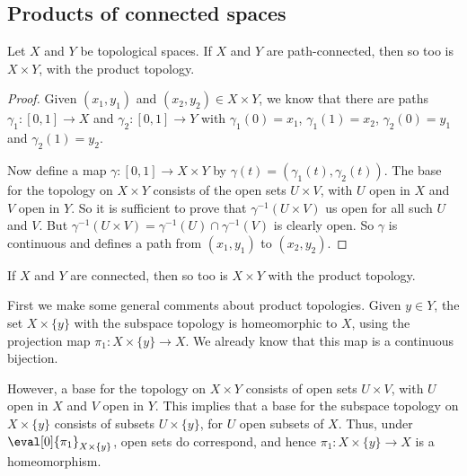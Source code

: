 
	\pagebreak

\subsection{Products of connected spaces} %
\label{sub:products_of_connected_spaces}

\begin{proposition}
	\label{prop:3-path-connected-product-topology}
	Let $X$ and $Y$ be topological spaces. If $X$ and $Y$ are path-connected, then so too is $X\times Y$, with the product topology.
\end{proposition}

\begin{proof}
	Given $(x_1,y_1)$ and $(x_2,y_2)\in X\times Y$, we know that there are paths $\gamma_1:[0,1]\to X$ and $\gamma_2:[0,1]\to Y$ with $\gamma_1(0)=x_1$, $\gamma_1(1)=x_2$, $\gamma_2(0)=y_1$ and $\gamma_2(1)=y_2$.
	
	Now define a map $\gamma:[0,1]\to X\times Y$ by $\gamma(t) = (\gamma_1(t),\gamma_2(t))$. %
	The base for the topology on $X\times Y$ consists of the open sets $U\times V$, with $U$ open in $X$ and $V$ open in $Y$. So it is sufficient to prove that $\gamma^{-1}(U\times V)$ us open for all such $U$ and $V$. But $\gamma^{-1}(U\times V)=\gamma^{-1}(U) \cap \gamma^{-1}(V)$ is clearly open. So $\gamma$ is continuous and defines a path from $(x_1,y_1)$ to $(x_2,y_2)$.
\end{proof}

\begin{proposition}
	If $X$ and $Y$ are connected, then so too is $X \times Y$ with the product topology. \label{prop:connected-products}
\end{proposition}

\vspace{-8pt}

First we make some general comments about product topologies. Given $y\in Y$, the set $X\times\{y\}$ with the subspace topology is homeomorphic to $X$, using the projection map $\pi_1:X \times \{y\} \to X$. We already know that this map is a continuous bijection.

However, a base for the topology on $X \times Y$ consists of open sets $U\times V$, with $U$ open in $X$ and $V$ open in $Y$. This implies that a base for the subspace topology on $X\times\{y\}$ consists of subsets $U\times\{y\}$, for $U$ open subsets of $X$. Thus, under $\eval[0]{\pi_1}_{X\times\{y\}}$, open sets do correspond, and hence $\pi_1:X\times \{y\} \to X$ is a homeomorphism.

